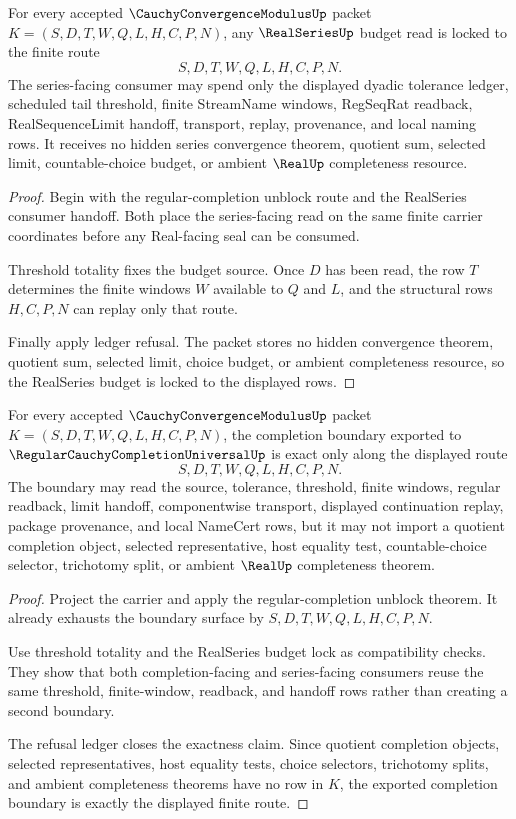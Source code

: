\begin{theorem}
\label{thm:cauchy-convergence-modulus-real-series-budget-lock}
For every accepted $\CauchyConvergenceModulusUp$ packet $K=(S,D,T,W,Q,L,H,C,P,N)$, any $\RealSeriesUp$ budget read is locked to the finite route
$$
S,D,T,W,Q,L,H,C,P,N.
$$
The series-facing consumer may spend only the displayed dyadic tolerance ledger, scheduled tail threshold, finite StreamName windows, RegSeqRat readback, RealSequenceLimit handoff, transport, replay, provenance, and local naming rows. It receives no hidden series convergence theorem, quotient sum, selected limit, countable-choice budget, or ambient $\RealUp$ completeness resource.
\end{theorem}
\begin{proof}
Begin with the regular-completion unblock route and the RealSeries consumer handoff. Both place the series-facing read on the same finite carrier coordinates before any Real-facing seal can be consumed.

Threshold totality fixes the budget source. Once $D$ has been read, the row $T$ determines the finite windows $W$ available to $Q$ and $L$, and the structural rows $H,C,P,N$ can replay only that route.

Finally apply ledger refusal. The packet stores no hidden convergence theorem, quotient sum, selected limit, choice budget, or ambient completeness resource, so the RealSeries budget is locked to the displayed rows.
\end{proof}

\begin{theorem}
\label{thm:cauchy-convergence-modulus-completion-boundary-exactness}
For every accepted $\CauchyConvergenceModulusUp$ packet $K=(S,D,T,W,Q,L,H,C,P,N)$, the completion boundary exported to $\RegularCauchyCompletionUniversalUp$ is exact only along the displayed route
$$
S,D,T,W,Q,L,H,C,P,N.
$$
The boundary may read the source, tolerance, threshold, finite windows, regular readback, limit handoff, componentwise transport, displayed continuation replay, package provenance, and local NameCert rows, but it may not import a quotient completion object, selected representative, host equality test, countable-choice selector, trichotomy split, or ambient $\RealUp$ completeness theorem.
\end{theorem}
\begin{proof}
Project the carrier and apply the regular-completion unblock theorem. It already exhausts the boundary surface by $S,D,T,W,Q,L,H,C,P,N$.

Use threshold totality and the RealSeries budget lock as compatibility checks. They show that both completion-facing and series-facing consumers reuse the same threshold, finite-window, readback, and handoff rows rather than creating a second boundary.

The refusal ledger closes the exactness claim. Since quotient completion objects, selected representatives, host equality tests, choice selectors, trichotomy splits, and ambient completeness theorems have no row in $K$, the exported completion boundary is exactly the displayed finite route.
\end{proof}

